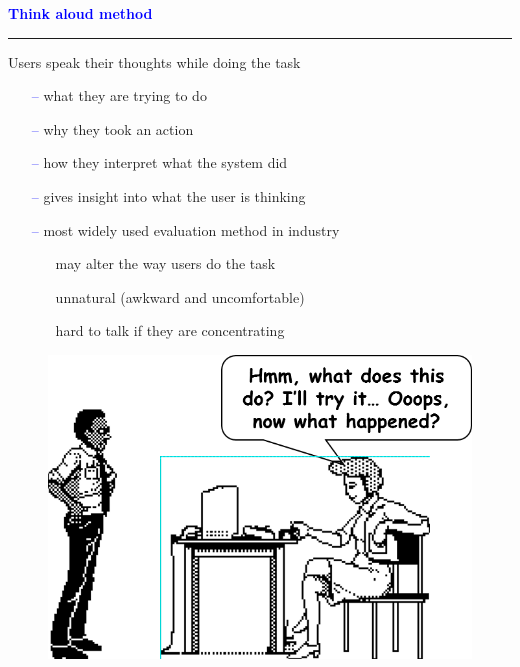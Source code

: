 \documentclass[pdf]{beamer}
\begin{document}
{%
{
\begin{frame}
	\vspace{8mm}
	\textcolor{Blue}{\textbf{\large{Think aloud method}}}
    \textcolor{red}{\rule{10cm}{1mm}}
    Users speak their thoughts while doing the task \par
    \begin{itemize}
      \item[\textcolor{Blue}{--}] what they are trying to do
      \item[\textcolor{Blue}{--}] why they took an action
      \item[\textcolor{Blue}{--}] how they interpret what the system did
      \item[\textcolor{Blue}{--}] gives insight into what the user is thinking
      \item[\textcolor{Blue}{--}] most widely used evaluation method in industry
      \begin{itemize}
        \item[\textcolor{Blue}{\textbullet}] may alter the way users do the task
        \item[\textcolor{Blue}{\textbullet}] unnatural (awkward and uncomfortable)
        \item[\textcolor{Blue}{\textbullet}] hard to talk if they are concentrating
      \end{itemize}
    \end{itemize}
    \vspace{-0.3cm}
    \begin{figure}[b]
    	\includegraphics[scale = 0.4, right]{17_Imagine.png}
    \end{figure}
\end{frame}}



}
\end{document}
